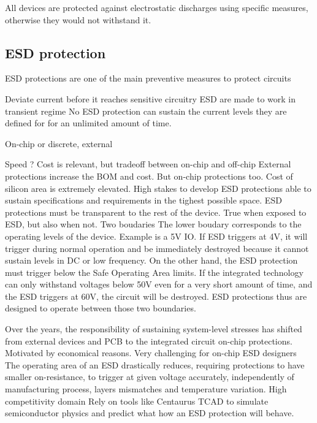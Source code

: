 All devices are protected against electrostatic discharges using specific measures, otherwise they would not withstand it.

\subsection{ESD protection}

ESD protections are one of the main preventive measures to protect circuits

Deviate current before it reaches sensitive circuitry
ESD are made to work in transient regime
No ESD protection can sustain the current levels they are defined for for an unlimited amount of time.

On-chip or discrete, external

Speed ?
Cost is relevant, but tradeoff between on-chip and off-chip
External protections increase the BOM and cost.
But on-chip protections too.
Cost of silicon area is extremely elevated.
High stakes to develop ESD protections able to sustain specifications and requirements in the tighest possible space.
ESD protections must be transparent to the rest of the device.
True when exposed to ESD, but also when not.
Two boudaries
The lower boudary corresponds to the operating levels of the device.
Example is a 5V IO.
If ESD triggers at 4V, it will trigger during normal operation and be immediately destroyed because it cannot sustain levels in DC or low frequency.
On the other hand, the ESD protection must trigger below the Safe Operating Area limits.
If the integrated technology can only withstand voltages below 50V even for a very short amount of time, and the ESD triggers at 60V, the circuit will be destroyed.
ESD protections thus are designed to operate between those two boundaries.

Over the years, the responsibility of sustaining system-level stresses has shifted from external devices and PCB to the integrated circuit on-chip protections.
Motivated by economical reasons.
Very challenging for on-chip ESD designers
The operating area of an ESD drastically reduces, requiring protections to have smaller on-resistance, to trigger at given voltage accurately, independently of manufacturing process, layers mismatches and temperature variation.
High competitivity domain
Rely on tools like Centaurus TCAD to simulate semiconductor physics and predict what how an ESD protection will behave.

